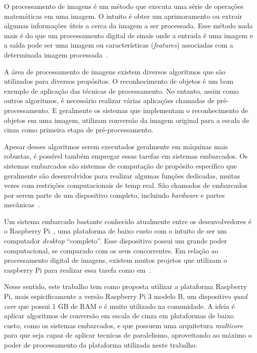 O processamento de imagens é um método que executa uma série de operações
matemáticas em uma imagem. O intuito é obter um aprimoramento ou extrair algumas
informações úteis a cerca da imagem a ser processada. Esse método nada mais é do
que um processamento digital de sinais onde a entrada é uma imagem e a saída
pode ser uma imagem ou características (\textit{features}) associadas com a
determinada imagem processada~\cite{Tartu19}.

A área de processamento de imagens existem diversos algoritmos que são
utilizados para diversos propósitos. O reconhocimento de objetos é um bom
exemplo de aplicação das técnicas de processamento. No entanto, assim como
outros algoritmos, é necessário realizar várias aplicações chamadas de
pré-processamento. E geralmente os sistemas que implementam o reconhecimento de
objetos em uma imagem, utilizam conversão da imagem original para a escala de
cinza como primeira etapa de pré-processamento.

Apesar desses algoritmos serem executados geralmente em máquinas mais robustas,
é possível também empregar essas tarefas em sistemas embarcados. Os sistemas
embarcados são sistemas de computação de propósito específico  que geralmente
são desenvolvidos para realizar algumas funções dedicadas, muitas vezes com
restrições computacionais de temp real. São chamados de embarcados por serem
parte de um dispositivo completo, incluindo \textit{hardware} e partes
mecânicas~\cite{Lamb15}.

Um sistema embarcado bastante conhecido atualmente entre os desenvolvedores é o
Raspberry Pi~\cite{raspberry}, uma plataforma de baixo custo com o intuito de
ser um computador \textit{desktop} ``completo''. Esse dispositivo possui um
grande poder computacional, se comparado com os seus concorrentes. Em relação ao
processamento digital de imagens, existem muitos projetos que utilizam o
raspberry Pi para realizar essa tarefa como em~\cite{Shilpashree15}.

Nesse sentido, este trabalho tem como proposta utilizar a plataforma Raspberry
Pi, mais espicificamente a versão Raspberry Pi 3 modelo B, um dispositivo
\textit{quad core} que possui 1 GB de RAM e é muito utilizado na comunidade. A
ideia é aplicar algoritmos de conversão em escala de cinza em plataformas de
baixo custo, como os sistemas embarcados, e que possuem uma arquitetura
\textit{multicore} para que seja capaz de aplicar tecnicas de paralelismo,
aproveitando ao máximo o poder de processamento da plataforma utilizada neste
trabalho.
